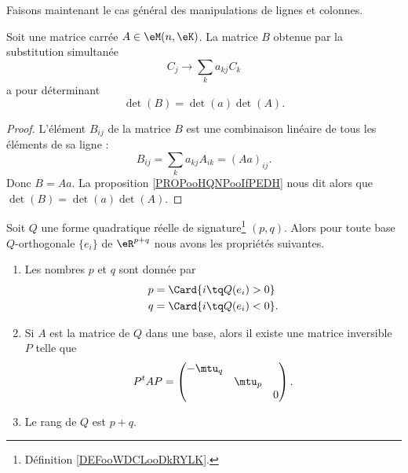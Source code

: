 Faisons maintenant le cas général des manipulations de lignes et colonnes.

\begin{proposition}     \label{PROPooSLLGooSZjQrv}
	Soit une matrice carrée \( A\in \eM(n,\eK)\). La matrice \( B\) obtenue par la substitution simultanée
	\begin{equation}
		C_j\to \sum_ka_{kj}C_k
	\end{equation}
	a pour déterminant
	\begin{equation}
		\det(B)=\det(a)\det(A).
	\end{equation}
\end{proposition}

\begin{proof}
	L'élément \( B_{ij}\) de la matrice \( B\) est une combinaison linéaire de tous les éléments de sa ligne :
	\begin{equation}
		B_{ij}=\sum_ka_{kj}A_{ik}=(Aa)_{ij}.
	\end{equation}
	Donc \( B=Aa\). La proposition \ref{PROPooHQNPooIfPEDH} nous dit alors que \( \det(B)=\det(a)\det(A)\).
\end{proof}

\begin{theorem}   \label{ThoQFVsBCk}
	Soit \( Q\) une forme quadratique réelle de signature\footnote{Définition \ref{DEFooWDCLooDkRYLK}.} \( (p,q)\). Alors pour toute base \( Q\)-orthogonale \( \{ e_i \}\) de \( \eR^{p+q}\) nous avons les propriétés suivantes.
	\begin{enumerate}
		\item       \label{ITEMooCFQHooRWfmpT}
		      Les nombres \( p\) et \( q\) sont donnée par
		      \begin{subequations}
			      \begin{align}
				      p & =\Card\{ i\tq Q(e_i)>0 \}             \label{SUBEQooONWLooNsgmQY} \\
				      q & =\Card\{ i\tq Q(e_i)<0 \}.        \label{SUBEQooFKXMooOVwvKR}
			      \end{align}
		      \end{subequations}
		\item       \label{ITEMooWLPVooSTOOjL}
		      Si \( A\) est la matrice de \( Q\) dans une base, alors il existe une matrice inversible \( P\) telle que
		      \begin{equation}
			      P^tAP=\begin{pmatrix}
				      -\mtu_q &        &   \\
				              & \mtu_p &   \\
				              &        & 0
			      \end{pmatrix}.
		      \end{equation}
		\item       \label{ITEMooGOHCooPrNQwm}
		      Le rang de \( Q\) est \( p+q\).
	\end{enumerate}
\end{theorem}

